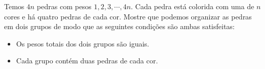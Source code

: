 Temos $4n$ pedras com pesos $1, 2, 3, \cdots, 4n$. Cada pedra está colorida com uma de $n$ cores e há quatro pedras de cada cor. Mostre que podemos organizar as pedras em dois grupos de modo que as seguintes condições são ambas satisfeitas:
\begin{itemize}
	\item Os pesos totais dos dois grupos são iguais.
	\item Cada grupo contém duas pedras de cada cor.
\end{itemize}

